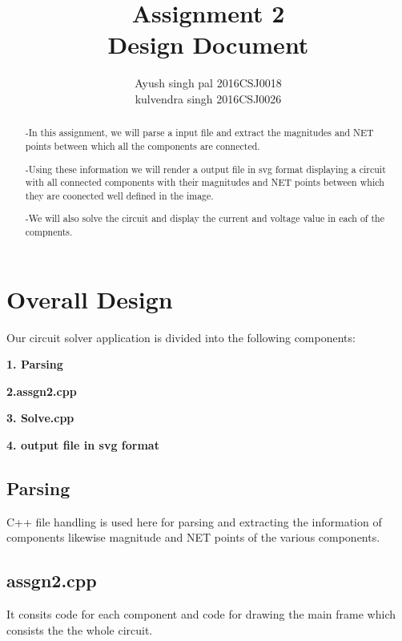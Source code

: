 \documentclass{report}
\begin{document}
\title{Assignment 2 \\ Design Document}
\author{Ayush singh pal 2016CSJ0018\\ 
kulvendra singh 2016CSJ0026   }

\maketitle
\pagebreak
\begin{abstract}

-In this assignment, we will parse a input file  and extract the magnitudes and NET points between which all the components are connected.

-Using these information we will render a output file in svg format displaying a circuit with all connected components with their magnitudes and NET points between which they are coonected well defined in the image.

-We will also solve the circuit and display the current and voltage value in each of the compnents.
 
\end{abstract}
\pagebreak
\section{Overall Design}
Our circuit solver application is divided into the following  components:
\begin{flushleft}
\textbf{1. Parsing }
\end{flushleft}
\begin{flushleft}
\textbf{2.assgn2.cpp}
\end{flushleft}
\begin{flushleft}
\textbf{3. Solve.cpp}
\end{flushleft}
\textbf{4. output file in svg format}
\subsection{Parsing}
C++ file handling is used here for parsing and extracting the information of components likewise magnitude and NET points of the various components.


\subsection{assgn2.cpp}

It consits code for each component and code for drawing the main frame which consists the the whole circuit.
\end{document}
